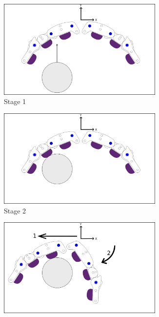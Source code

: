 \begin{figure}[ht]
    \centering
    \begin{subfigure}{.45\linewidth}
        \centering
        \includegraphics[width=0.9\textwidth]{Images/stage1.png}
        \caption{Stage 1}
        \label{subfigure:Stage1}
    \end{subfigure}
    \begin{subfigure}{.45\linewidth}
        \centering
        \includegraphics[width=0.9\textwidth]{Images/stage2.png}
       \caption{Stage 2}
        \label{subfigure:Stage2}
    \end{subfigure}
    \begin{subfigure}{.45\linewidth}
        \centering
        \includegraphics[width=0.9\textwidth]{Images/stage3.png}

\end{subfigure}
\end{figure}
